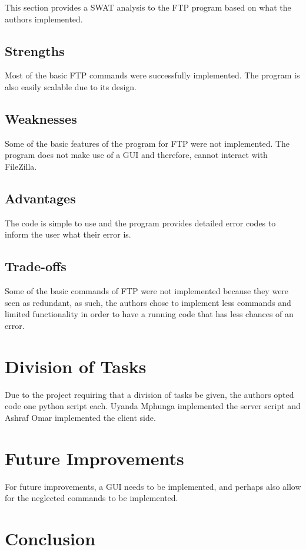\documentclass[journal, a4paper]{IEEEtran}
\begin{document}
This section provides a SWAT analysis to the FTP program based on what the authors implemented. 

\subsection{Strengths}
Most of the basic FTP commands were successfully implemented. The program is also easily scalable due to its design.

\subsection{Weaknesses}
Some of the basic features of the program for FTP were not implemented. The program does not make use of a GUI and therefore, cannot interact with FileZilla. 

\subsection{Advantages}
The code is simple to use and the program provides detailed error codes to inform the user what their error is.


\subsection{Trade-offs}
Some of the basic commands of FTP were not implemented because they were seen as redundant, as such, the authors chose to implement less commands and limited functionality in order to have a running code that has less chances of an error. 


\section{Division of Tasks}

Due to the project requiring that a division of tasks be given, the authors opted code one python script each. Uyanda Mphunga implemented the server script and Ashraf Omar implemented the client side.

\section{Future Improvements}

For future improvements, a GUI needs to be implemented, and perhaps also allow for the neglected commands to be implemented.

\section{Conclusion}

%
\onecolumn



\end{document}
